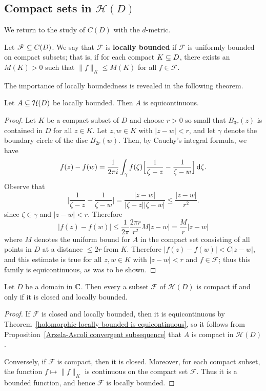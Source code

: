 \subsection{Compact sets in $\mathcal{H}(D)$}
We return to the study of $C(D)$ with the $d$-metric.
\begin{definition}
Let $\mathscr{F}\subseteq C(D)$. We say that $\mathscr{F}$ is \textbf{locally bounded} if $\mathscr{F}$ is uniformly bounded on compact subsets; that is, if for each compact $K\subseteq D$, there exists an $M(K)>0$ such that $\|f\|_K\leq M(K)$ for all $f\in\mathscr{F}$.
\end{definition}
The importance of locally boundedness is revealed in the following theorem.
\begin{theorem}\label{holomorphic locally bounded is equicontinuous}
Let $A\subseteq\mathcal{H}(D)$ be locally bounded. Then $A$ is equicontinuous. 
\end{theorem}
\begin{proof}
Let $K$ be a compact subset of $D$ and choose $r>0$ so small that $B_{3r}(z)$ is contained in $D$ for all $z\in K$. Let $z,w\in K$ with $|z-w|<r$, and let $\gamma$ denote the boundary circle of the disc $B_{2r}(w)$. Then, by Cauchy's integral formula, we have
\[f(z)-f(w)=\frac{1}{2\pi i}\int_{\gamma}f(\zeta)\Big[\frac{1}{\zeta-z}-\frac{1}{\zeta-w}\Big]\mathop{}\!\mathrm{d}\zeta.\]
Observe that
\[\Big|\frac{1}{\zeta-z}-\frac{1}{\zeta-w}\Big|=\frac{|z-w|}{|\zeta-z||\zeta-w|}\leq\frac{|z-w|}{r^2}.\]
since $\zeta\in\gamma$ and $|z-w|<r$. Therefore
\[|f(z)-f(w)|\leq\frac{1}{2\pi}\frac{2\pi r}{r^2}M|z-w|=\frac{M}{r}|z-w|\]
where $M$ denotes the uniform bound for $A$ in the compact set consisting of all points in $D$ at a distance $\leq 2r$ from $K$. Therefore $|f(z)-f(w)|<C|z-w|$, and this estimate is true for all $z,w\in K$ with $|z-w|<r$ and $f\in\mathscr{F}$; thus this family is equicontinuous, as was to be shown.
\end{proof}
\begin{theorem}\label{holomorphic compact theorem}
Let $D$ be a domain in $\mathbb{C}$. Then every a subset $\mathscr{F}$ of $\mathcal{H}(D)$ is compact if and only if it is closed and locally bounded.
\end{theorem}
\begin{proof}
If $\mathscr{F}$ is closed and locally bounded, then it is equicontinuous by Theorem~\ref{holomorphic locally bounded is equicontinuous}, so it follows from Proposition~\ref{Arzela-Ascoli convergent subsequence} that $A$ is compact in $\mathcal{H}(D)$.\par
Conversely, if $\mathscr{F}$ is compact, then it is closed. Moreover, for each compact subset, the function $f\mapsto\|f\|_K$ is continuous on the compact set $\mathscr{F}$. Thus it is a bounded function, and hence $\mathscr{F}$ is locally bounded.
\end{proof}
